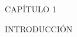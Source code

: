 \newpage
\thispagestyle{empty}
\vspace*{\fill}
\begingroup
\centering
\begin{flushright}{\fontsize{50}{60}\selectfont CAPÍTULO 1}\end{flushright}
\vspace{10 mm}
\begin{flushright}{\fontsize{30}{40}\selectfont INTRODUCCIÓN }\end{flushright}
\endgroup
\vspace*{\fill}
\newpage